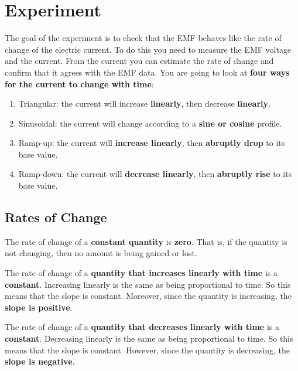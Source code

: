 \section{Experiment}
The goal of the experiment is to check that the EMF behaves like the rate of change of the electric current. To do this you need to measure the EMF voltage and the current. From the current you can estimate the rate of change and confirm that it agrees with the EMF data. You are going to look at \textbf{four ways for the current to change with time}:
\begin{enumerate}
	\item Triangular: the current will increase \textbf{linearly}, then decrease \textbf{linearly}.
	\item Sinusoidal: the current will change according to a \textbf{sine or cosine} profile.
	\item Ramp-up: the current will \textbf{increase linearly}, then \textbf{abruptly drop} to its base value.
	\item Ramp-down: the current will \textbf{decrease linearly}, then \textbf{abruptly rise} to its base value.
\end{enumerate}
\subsection{Rates of Change}
The rate of change of a \textbf{constant quantity} is \textbf{zero}. That is, if the quantity is not changing, then no amount is being gained or lost.

The rate of change of a \textbf{quantity that increases linearly with time} is a \textbf{constant}. Increasing linearly is the same as being proportional to time. So this means that the slope is constant. Moreover, since the quantity is increasing, the \textbf{slope is positive}.

The rate of change of a \textbf{quantity that decreases linearly with time} is a \textbf{constant}. Decreasing linearly is the same as being proportional to time. So this means that the slope is constant. However, since the quantity is decreasing, the \textbf{slope is negative}.

